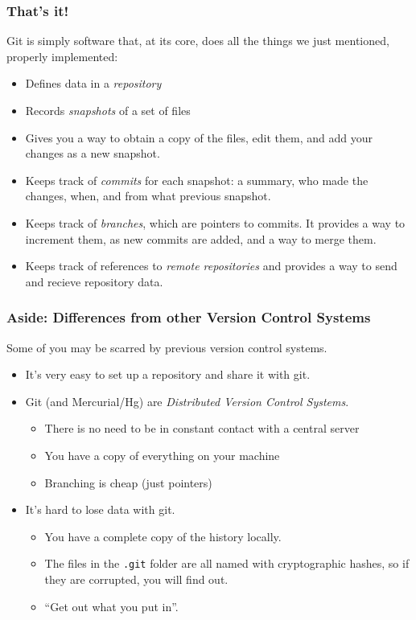 \documentclass{beamer}
\begin{document}
\begin{frame}[fragile]
\frametitle{That's it!}
Git is simply software that, at its core, does all the things we just mentioned, properly implemented:
\begin{itemize}
\item Defines data in a \emph{repository}
\item Records \emph{snapshots} of a set of files
\item Gives you a way to obtain a copy of the files, edit them, and add your changes as a new snapshot.
\item Keeps track of \emph{commits} for each snapshot: a summary, who made the changes, when, and from what previous snapshot.
\item Keeps track of \emph{branches}, which are pointers to commits. It provides a way to increment them, as new commits are added, and a way to merge them.
\item Keeps track of references to \emph{remote repositories} and provides a way to send and recieve repository data.
\end{itemize}
\end{frame}

\begin{frame}[fragile]
\frametitle{Aside: Differences from other Version Control Systems}
Some of you may be scarred by previous version control systems.
\begin{itemize}
\item It's very easy to set up a repository and share it with git.
\item Git (and Mercurial/Hg) are \emph{Distributed Version Control Systems}.
\begin{itemize}
\item There is no need to be in constant contact with a central server
\item You have a copy of everything on your machine
\item Branching is cheap (just pointers)
\end{itemize}
\item It's hard to lose data with git.
\begin{itemize}
\item
You have a complete copy of the history locally.
\item The files in the \texttt{.git} folder are all named with cryptographic hashes, so if they are corrupted, you will find out.
\item ``Get out what you put in''.
\end{itemize}
\end{itemize}
\end{frame}
\end{document}
